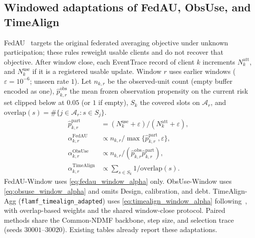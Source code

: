 \subsection{Windowed adaptations of FedAU, ObsUse, and TimeAlign}
FedAU~\cite{wang2024lightweight} targets the original federated averaging
objective under unknown participation; these rules reweight usable clients
and do not recover that objective.
After window close, each EventTrace record of client \(k\) increments
\(N^{\mathrm{att}}_k\), and \(N^{\mathrm{use}}_k\) if it is a registered
usable update.  Window \(r\) uses earlier windows
(\(\varepsilon=10^{-6}\); unseen rate \(1\)).
Let \(n_{k,r}\) be the observed-unit count (empty buffer encoded as one),
\(\widehat p^{\mathrm{obs}}_{k,r}\) the mean frozen observation propensity
on the current risk set clipped below at \(0.05\) (or \(1\) if empty),
\(S_k\) the covered slots on \(\mathcal{A}_r\), and
\(\mathrm{overlap}(s)=\#\{j\in\mathcal{A}_r:s\in S_j\}\).
\begin{align}
 \widehat p^{\mathrm{part}}_{k,r}
 &=
 (N^{\mathrm{use}}_k+\varepsilon)/(N^{\mathrm{att}}_k+\varepsilon),
 \label{eq:fedau_part_rate}\\
 \alpha^{\mathrm{FedAU}}_{k,r}
 &\propto n_{k,r}/\max\{\widehat p^{\mathrm{part}}_{k,r},\varepsilon\},
 \label{eq:fedau_window_alpha}\\
 \alpha^{\mathrm{ObsUse}}_{k,r}
 &\propto n_{k,r}/(\widehat p^{\mathrm{obs}}_{k,r}\widehat p^{\mathrm{part}}_{k,r}),
 \label{eq:obsuse_window_alpha}\\
 \alpha^{\mathrm{TimeAlign}}_{k,r}
 &\propto \sum_{s\in S_k}1/\mathrm{overlap}(s).
 \label{eq:timealign_window_alpha}
\end{align}
FedAU-Window uses \eqref{eq:fedau_window_alpha} only.
ObsUse-Window uses \eqref{eq:obsuse_window_alpha} and omits Design, calibration, and debt.
TimeAlign-Agg (\texttt{flamf\_timealign\_adapted}) uses
\eqref{eq:timealign_window_alpha} following~\cite{wang2026federated},
with overlap-based weights and the shared window-close protocol.
Paired methods share the Common-NDMF backbone, step size, and selection
trace (seeds \(30001\)--\(30020\)).  Existing tables already report
these adaptations.



